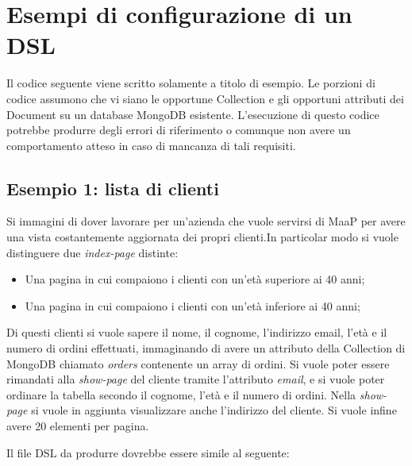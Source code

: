 \section{Esempi di configurazione di un DSL}

Il codice seguente viene scritto solamente a titolo di esempio. Le porzioni di codice assumono che vi siano le opportune Collection e gli opportuni attributi dei Document su un database MongoDB esistente. L'esecuzione di questo codice potrebbe produrre degli errori di riferimento o comunque non avere un comportamento atteso in caso di mancanza di tali requisiti.

\subsection{Esempio 1: lista di clienti}

Si immagini di dover lavorare per un'azienda che vuole servirsi di MaaP per avere una vista costantemente aggiornata dei propri clienti.In particolar modo si vuole distinguere due \textit{index-page} distinte: 

\begin{itemize}

	\item Una pagina in cui compaiono i clienti con un'età superiore ai 40 anni;
	\item Una pagina in cui compaiono i clienti con un'età inferiore ai 40 anni;

\end{itemize}

Di questi clienti si vuole sapere il nome, il cognome, l'indirizzo email, l'età e il numero di ordini effettuati, immaginando di avere un attributo della Collection di MongoDB chiamato \textit{orders} contenente un array di ordini. Si vuole poter essere rimandati alla \textit{show-page} del cliente tramite l'attributo \textit{email}, e si vuole poter ordinare la tabella secondo il cognome, l'età e il numero di ordini. Nella \textit{show-page} si vuole in aggiunta visualizzare anche l'indirizzo del cliente. Si vuole infine avere 20 elementi per pagina.

Il file DSL da produrre dovrebbe essere simile al seguente:

